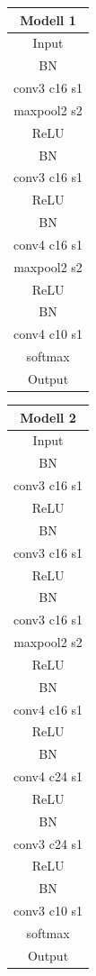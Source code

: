 \documentclass[a4paper,11pt,twoside]{article}
\begin{document}
\begin{center}
    \begin{tabular}{ | c |}
    \hline
    		\textbf{Modell 1} \\ \hline \hline
    		Input \\ \hline
    		BN \\ \hline
            conv3 c16 s1\\ \hline
            maxpool2 s2\\ \hline
            ReLU\\ \hline
            BN\\ \hline
            conv3 c16 s1\\ \hline
            ReLU\\ \hline
            BN\\ \hline
            conv4 c16 s1\\ \hline
            maxpool2 s2\\ \hline
            ReLU\\ \hline
            BN\\ \hline
            conv4 c10 s1\\ \hline
            softmax \\ \hline
            Output \\
    \hline
    \end{tabular}
	\qquad   
    \begin{tabular}{ | c |}
    \hline
    		\textbf{Modell 2} \\ \hline \hline
 			Input \\ \hline
 			BN \\ \hline
            conv3 c16 s1 \\ \hline
            ReLU \\ \hline
            BN \\ \hline
            conv3 c16 s1\\ \hline
            ReLU\\ \hline
            BN\\ \hline
            conv3 c16 s1\\ \hline
            maxpool2 s2\\ \hline
            ReLU\\ \hline
            BN\\ \hline
            conv4 c16 s1\\ \hline
            ReLU\\ \hline
            BN\\ \hline
            conv4 c24 s1\\ \hline
            ReLU\\ \hline
            BN\\ \hline
            conv3 c24 s1\\ \hline
            ReLU\\ \hline
            BN\\ \hline
            conv3 c10 s1\\ \hline
            softmax \\ \hline
            Output \\
    \hline
    \end{tabular}
\end{center}
\end{document}
